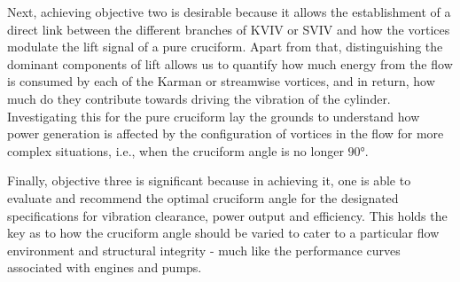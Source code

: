 \documentclass[oneside]{utmthesis}
\begin{document}
Next, achieving objective two is desirable because it allows the establishment of a direct link between the different branches of KVIV or SVIV and how the vortices modulate the lift signal of a pure cruciform. Apart from that, distinguishing the dominant components of lift allows us to quantify how much energy from the flow is consumed by each of the Karman or streamwise vortices, and in return, how much do they contribute towards driving the vibration of the cylinder. Investigating this for the pure cruciform lay the grounds to understand how power generation is affected by the configuration of vortices in the flow for more complex situations, i.e., when the cruciform angle is no longer $90 \si{\degree}$.

Finally, objective three is significant because in achieving it, one is able to evaluate and recommend the optimal cruciform angle for the designated specifications for vibration clearance, power output and efficiency. This holds the key as to how the cruciform angle should be varied to cater to a particular flow environment and structural integrity - much like the performance curves associated with engines and pumps.


\end{document}

